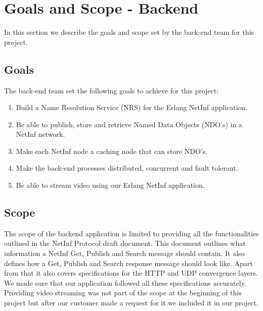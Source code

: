 \section{Goals and Scope - Backend}
In this section we describe the goals and scope set by the back-end team for this project.

\subsection{Goals}
The back-end team set the following goals to achieve for this project:
\begin{enumerate}
 \item {Build a Name Resolution Service (NRS) for the Erlang NetInf application.}\\
 \item {Be able to publish, store and retrieve Named Data Objects (NDO's) in a NetInf network.}\\
 \item {Make each NetInf node a caching node that can store NDO's.}\\
 \item {Make the back-end processes distributed, concurrent and fault tolerant.}\\ 
 \item {Be able to stream video using our Erlang NetInf application.}\\
  \end{enumerate}

\subsection{Scope}
The scope of the backend application is limited to providing all the functionalities outlined in the NetInf Protocol draft document. \cite{netinfproto} This document outlines what information a NetInf Get, Publish and Search message should contain. It also defines how a Get, Publish and Search response message should look like. Apart from that it also covers specifications for the HTTP and UDP convergence layers. We made sure that our application followed all these specifications accurately. Providing video streaming was not part of the scope at the beginning of this project but after our customer made a request for it we included it in our project. 
